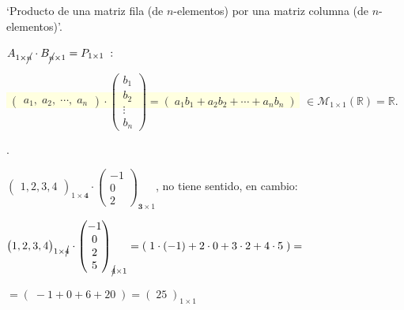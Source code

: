 \begin{defi}
`Producto de una matriz fila (de $n$-elementos) por una matriz columna (de $n$-elementos)'.

$A_{1\times \cancel{n}}\cdot B_{\cancel{n}\times 1} = P_{1\times 1} \; : \; \; $

\noindent  \colorbox{LightYellow}{$\boxed{\; \left( \begin{matrix} a_1, \; a_2, \; \cdots, \; a_n   \end{matrix}\right)  \cdot  
\left( \begin{matrix} b_1 \\ b_2 \\ \vdots \\ b_n  \end{matrix}\right) = (\;a_1 b_1+ a_2 b_2 + \cdots + a_n b_n \; )\; }$} \tiny{$ \in \mathcal M_{1 \times 1}(\mathbb R)=\mathbb R$}\normalsize{.} 
\end{defi}
\begin{ejem}.

\small{$\left( \begin{matrix} 1, 2, 3, 4   \end{matrix}\right)_{1 \times \boldsymbol{4}} \cdot \left( \begin{matrix} -1 \\ 0 \\ 2  \end{matrix}\right)_{\boldsymbol{3} \times 1}$, no tiene sentido, en cambio:}

\small{$\left( \begin{matrix} 1, 2, 3, 4   \end{matrix}\right)_{1\times \cancel{4}}\cdot \left( \begin{matrix} -1 \\ 0 \\ 2 \\5 \end{matrix}\right)_{\cancel{4} \times 1}= (\; 1\cdot (-1)+ 2 \cdot 0 + 3 \cdot 2 + 4 \cdot 5\;)= $}

\small{$=(\; -1+0+6+20\; ) = (\; 25 \; )_{1\times 1}$}
\end{ejem}
